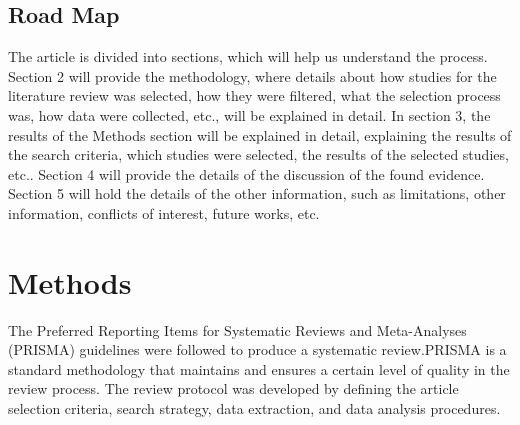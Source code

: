 \documentclass[twocolumn,12pt,a4paper]{article}
\begin{document}
\subsection{Road Map}
The article is divided into sections, which will help us understand the process. Section 2 will provide the methodology, where details about how studies for the literature review was selected, how they were filtered, what the selection process was, how data were collected, etc., will be explained in detail. In section 3, the results of the Methods section will be explained in detail, explaining the results of the search criteria, which studies were selected, the results of the selected studies, etc.. Section 4 will provide the details of the discussion of the found evidence. Section 5 will hold the details of the other information, such as limitations, other information, conflicts of interest, future works, etc.

\section{Methods}
The Preferred Reporting Items for Systematic Reviews and Meta-Analyses (PRISMA) guidelines were followed to produce a systematic review\cite{page2021prisma}.\linebreak PRISMA is a standard methodology that maintains and ensures a certain level of quality in the review process. The review protocol was developed by defining the article selection criteria, search strategy, data extraction, and data analysis procedures.
\end{document}
